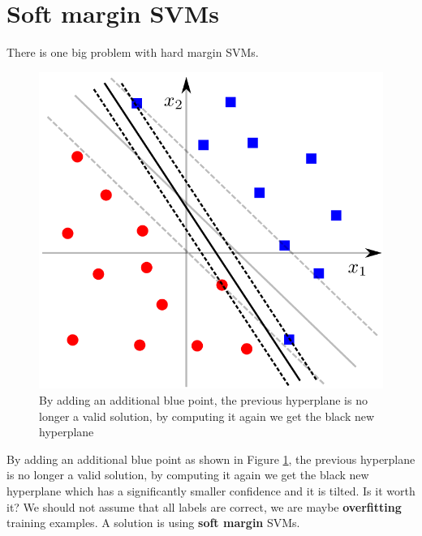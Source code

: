 \section{Soft margin SVMs}
There is one big problem with hard margin SVMs.
\begin{figure}[H]
	\centering
	\includegraphics[scale=0.3]{
        images/13_SupportVectorMachines_hardSVM.png
    }
	\caption{By adding an additional blue point, the previous hyperplane is no longer
	a valid solution, by computing it again we get the black new hyperplane}
	\label{fig:hardSVM_problem}
\end{figure}
By adding an additional blue point as shown in Figure \ref{fig:hardSVM_problem},
the previous hyperplane is no longer a valid solution, by computing it again we get
the black new hyperplane which has a significantly smaller confidence and it is tilted.
Is it worth it? We should not assume that all labels are correct, we are maybe
\textbf{overfitting} training examples. A solution is using \textbf{soft margin}
SVMs.\\

